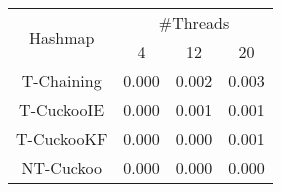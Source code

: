 \begin{tabular}{|c|c|c|c|}
\hline
\multirow{2}{*}{Hashmap} & \multicolumn{3}{c|}{\#Threads}\\\cline{2-4}& 4 & 12 & 20\\
\hline
\hline
T-Chaining & 0.000 & 0.002 & 0.003\\
T-CuckooIE & 0.000 & 0.001 & 0.001\\
T-CuckooKF & 0.000 & 0.000 & 0.001\\
NT-Cuckoo & 0.000 & 0.000 & 0.000\\
\hline
\end{tabular}
